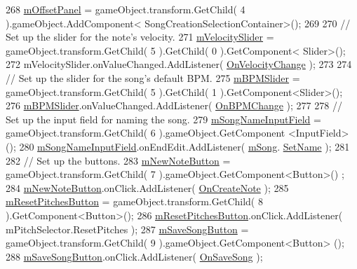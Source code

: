\begin{DoxyCode}
268         \hyperlink{group___s_c_m_priv_var_ga86a44007a4b127d7aa61f75dd34a3409}{mOffsetPanel} = gameObject.transform.GetChild( 4 ).gameObject.AddComponent<
      SongCreationSelectionContainer>();
269 
270         \textcolor{comment}{// Set up the slider for the note's velocity.}
271         \hyperlink{group___s_c_m_priv_var_ga7316e5e8f15d1574fc6cb4bd739bbf0a}{mVelocitySlider} = gameObject.transform.GetChild( 5 ).GetChild( 0 ).GetComponent<
      Slider>();
272         mVelocitySlider.onValueChanged.AddListener( \hyperlink{group___s_c_m_handlers_ga45e79bb31be34e3e2cc47bd6a6563b40}{OnVelocityChange} );
273 
274         \textcolor{comment}{// Set up the slider for the song's default BPM.}
275         \hyperlink{group___s_c_m_priv_var_ga87ac3691ad7848394e51442f29d9659d}{mBPMSlider} = gameObject.transform.GetChild( 5 ).GetChild( 1 ).GetComponent<Slider>();
276         \hyperlink{group___s_c_m_priv_var_ga87ac3691ad7848394e51442f29d9659d}{mBPMSlider}.onValueChanged.AddListener( \hyperlink{group___s_c_m_handlers_gae5930497314c77bd9c52c083b2f3e82e}{OnBPMChange} );
277 
278         \textcolor{comment}{// Set up the input field for naming the song.        }
279         \hyperlink{group___s_c_m_priv_var_ga0dd175c73748d5cc8ba4621f36126255}{mSongNameInputField} = gameObject.transform.GetChild( 6 ).gameObject.GetComponent
      <InputField>();
280         \hyperlink{group___s_c_m_priv_var_ga0dd175c73748d5cc8ba4621f36126255}{mSongNameInputField}.onEndEdit.AddListener( \hyperlink{group___s_c_m_priv_var_gabd8329149faef65a689650d951a9abc9}{mSong}.
      \hyperlink{group___song_pub_func_gacb01510cf72657fc7c64bb6ba00c2c56}{SetName} );
281 
282         \textcolor{comment}{// Set up the buttons.}
283         \hyperlink{group___s_c_m_priv_var_gac17f83788e480bb97160d17bbe69aab3}{mNewNoteButton} = gameObject.transform.GetChild( 7 ).gameObject.GetComponent<Button>()
      ;
284         \hyperlink{group___s_c_m_priv_var_gac17f83788e480bb97160d17bbe69aab3}{mNewNoteButton}.onClick.AddListener( \hyperlink{group___s_c_m_handlers_gaed512eb78e060a40616e6e31ce029440}{OnCreateNote} );
285         \hyperlink{group___s_c_m_priv_var_ga7f15c9af246da41fe9f7aafb16744214}{mResetPitchesButton} = gameObject.transform.GetChild( 8 ).GetComponent<Button>();
286         \hyperlink{group___s_c_m_priv_var_ga7f15c9af246da41fe9f7aafb16744214}{mResetPitchesButton}.onClick.AddListener( mPitchSelector.ResetPitches );
287         \hyperlink{group___s_c_m_priv_var_gaf43eabc869ead30d8ac7027e07502289}{mSaveSongButton} = gameObject.transform.GetChild( 9 ).gameObject.GetComponent<Button>
      ();
288         \hyperlink{group___s_c_m_priv_var_gaf43eabc869ead30d8ac7027e07502289}{mSaveSongButton}.onClick.AddListener( \hyperlink{group___s_c_m_handlers_gafd5e9f72e7a15cb77994c59fbbf8b769}{OnSaveSong} );

\end{DoxyCode}
